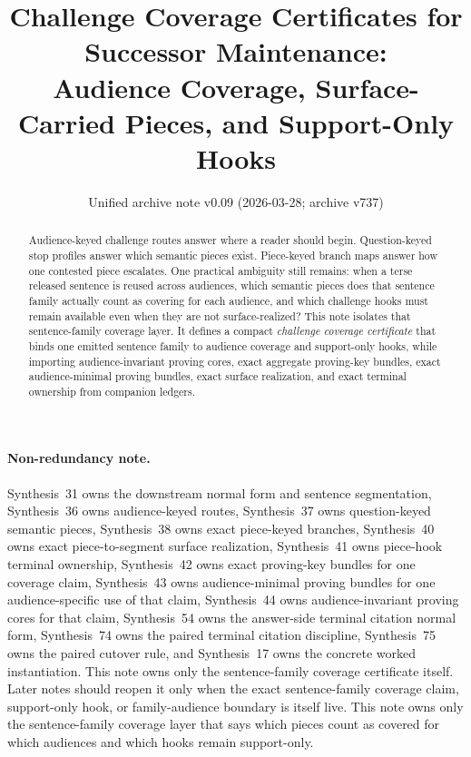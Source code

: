 \documentclass[11pt]{article}
\title{Challenge Coverage Certificates for Successor Maintenance:\\[0.5ex]
\large Audience Coverage, Surface-Carried Pieces, and Support-Only Hooks}
\author{}
\date{Unified archive note v0.09 (2026-03-28; archive v737)}
\begin{document}
\maketitle

\begin{abstract}
Audience-keyed challenge routes answer where a reader should begin.
Question-keyed stop profiles answer which semantic pieces exist.
Piece-keyed branch maps answer how one contested piece escalates.
One practical ambiguity still remains: when a terse released sentence is reused across audiences, which semantic pieces does that sentence family actually count as covering for each audience, and which challenge hooks must remain available even when they are not surface-realized?
This note isolates that sentence-family coverage layer.
It defines a compact \emph{challenge coverage certificate} that binds one emitted sentence family to audience coverage and support-only hooks, while importing audience-invariant proving cores, exact aggregate proving-key bundles, exact audience-minimal proving bundles, exact surface realization, and exact terminal ownership from companion ledgers.
\end{abstract}

\paragraph{Non-redundancy note.}
Synthesis~31 owns the downstream normal form and sentence segmentation, Synthesis~36 owns audience-keyed routes, Synthesis~37 owns question-keyed semantic pieces, Synthesis~38 owns exact piece-keyed branches, Synthesis~40 owns exact piece-to-segment surface realization, Synthesis~41 owns piece-hook terminal ownership, Synthesis~42 owns exact proving-key bundles for one coverage claim, Synthesis~43 owns audience-minimal proving bundles for one audience-specific use of that claim, Synthesis~44 owns audience-invariant proving cores for that claim, Synthesis~54 owns the answer-side terminal citation normal form, Synthesis~74 owns the paired terminal citation discipline, Synthesis~75 owns the paired cutover rule, and Synthesis~17 owns the concrete worked instantiation.
This note owns only the sentence-family coverage certificate itself. Later notes should reopen it only when the exact sentence-family coverage claim, support-only hook, or family-audience boundary is itself live.
This note owns only the sentence-family coverage layer that says which pieces count as covered for which audiences and which hooks remain support-only.
\end{document}
